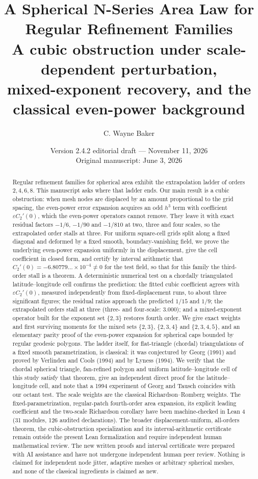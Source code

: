 \documentclass[11pt]{article}
\title{A Spherical N-Series Area Law for Regular Refinement Families\\[2pt]
\large A cubic obstruction under scale-dependent perturbation,\\
mixed-exponent recovery, and the classical even-power background}
\author{C. Wayne Baker}
\date{Version 2.4.2 editorial draft --- November 11, 2026\\ Original manuscript: June 3, 2026}
\theoremstyle{remark}
\begin{document}
\maketitle

\begin{abstract}
Regular refinement families for spherical area exhibit the extrapolation ladder of orders
$2,4,6,8$. This manuscript asks where that ladder ends. Our main result is a cubic
obstruction: when mesh nodes are displaced by an amount proportional to the grid spacing, the
even-power error expansion acquires an odd $h^3$ term with coefficient $\varepsilon C_2'(0)$,
which the even-power operators cannot remove. They leave it with exact residual factors
$-1/6$, $-1/90$ and $-1/810$ at two, three and four scales, so the extrapolated order stalls
at three. For uniform square-cell grids split along a fixed diagonal and deformed by a fixed
smooth, boundary-vanishing field, we prove the underlying even-power expansion uniformly in
the displacement, give the cell coefficient in closed form, and certify by interval
arithmetic that $C_2'(0)=-6.80779\ldots\times10^{-4}\neq0$ for the test field, so that for this
family the third-order stall is a theorem. A deterministic numerical test on a chordally triangulated latitude--longitude cell
confirms the prediction: the fitted cubic coefficient agrees with $\varepsilon C_2'(0)$,
measured independently from fixed-displacement runs, to about three significant figures; the
residual ratios approach the predicted $1/15$ and $1/9$; the extrapolated orders stall at
three (three- and four-scale: $3.000$); and a mixed-exponent operator built for the exponent set $\{2,3\}$ restores fourth
order. We give exact weights and first surviving moments for the mixed sets $\{2,3\}$,
$\{2,3,4\}$ and $\{2,3,4,5\}$, and an elementary parity proof of the even-power expansion for
spherical caps bounded by regular geodesic polygons. The ladder itself, for flat-triangle
(chordal) triangulations of a fixed smooth parametrization, is classical: it was conjectured
by Georg (1991) and proved by Verlinden and Cools (1994) and by Lyness (1994). We verify that
the chordal spherical triangle, fan-refined polygon and uniform latitude--longitude cell of
this study satisfy that theorem, give an independent direct proof for the latitude--longitude
cell, and note that a 1994 experiment of Georg and Tausch coincides with our octant test. The
scale weights are the classical Richardson--Romberg weights. The fixed-parametrization, regular-patch fourth-order area expansion, its explicit leading
coefficient and the two-scale Richardson corollary have been machine-checked in Lean 4 (31
modules, 126 audited declarations). The broader displacement-uniform, all-orders theorem,
the cubic-obstruction specialization and its interval-arithmetic certificate remain outside
the present Lean formalization and require independent human mathematical review. The new written proofs and interval certificate were prepared with AI assistance and have not undergone independent human peer review. Nothing is claimed for independent node jitter, adaptive meshes or arbitrary
spherical meshes, and none of the classical ingredients is claimed as new.
\end{abstract}
\end{document}
